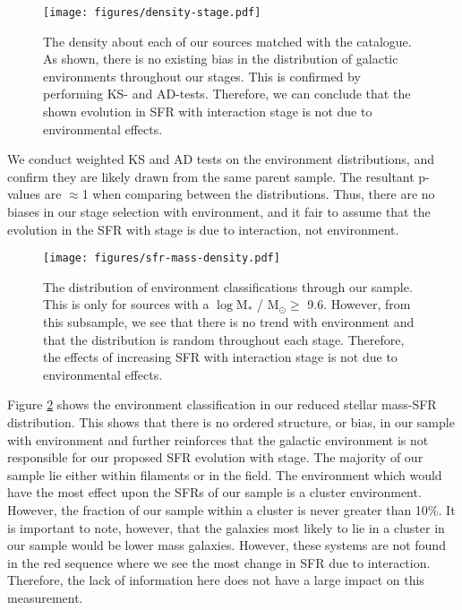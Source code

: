 \documentclass[fleqn,usenatbib]{mnras}
\begin{document}
\begin{figure}
    \centering
    \texttt{[image: figures/density-stage.pdf]}
    \caption{The density about each of our sources matched with the \citet{2017ApJ...837...16D} catalogue. As shown, there is no existing bias in the distribution of galactic environments throughout our stages. This is confirmed by performing KS- and AD-tests. Therefore, we can conclude that the shown evolution in SFR with interaction stage is not due to environmental effects.}
    \label{fig:dens-stage}
\end{figure}

We conduct weighted KS and AD tests on the environment distributions, and confirm they are likely drawn from the same parent sample. The resultant p-values are $\approx$1 when comparing between the distributions. Thus, there are no biases in our stage selection with environment, and it fair to assume that the evolution in the SFR with stage is due to interaction, not environment.

\begin{figure}
    \centering
    \texttt{[image: figures/sfr-mass-density.pdf]}
    \caption{The distribution of environment classifications through our sample. This is only for sources with a $\log$M$_*$ / M$_\odot \geq$ 9.6. However, from this subsample, we see that there is no trend with environment and that the distribution is random throughout each stage. Therefore, the effects of increasing SFR with interaction stage is not due to environmental effects.}
    \label{fig:dens-sfr-mass}
\end{figure}

Figure \ref{fig:dens-sfr-mass} shows the environment classification in our reduced stellar mass-SFR distribution. This shows that there is no ordered structure, or bias, in our sample with environment and further reinforces that the galactic environment is not responsible for our proposed SFR evolution with stage. The majority of our sample lie either within filaments or in the field. The environment which would have the most effect upon the SFRs of our sample is a cluster environment. However, the fraction of our sample within a cluster is never greater than 10\%. It is important to note, however, that the galaxies most likely to lie in a cluster in our sample would be lower mass galaxies. However, these systems are not found in the red sequence where we see the most change in SFR due to interaction. Therefore, the lack of information here does not have a large impact on this measurement. 
\end{document}
